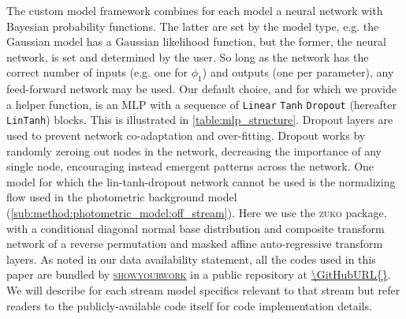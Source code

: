 \documentclass[twocolumn]{aastex631}
\newcommand{\code}[1]{\textsc{#1}}
\newcommand{\package}[1]{\code{#1}}
\begin{document}
        The custom model framework combines for each model a neural network with
        Bayesian probability functions. The latter are set by the model type,
        e.g. the Gaussian model has a Gaussian likelihood function, but the
        former, the neural network, is set and determined by the user. So long
        as the network has the correct number of inputs (e.g. one for $\phi_1$)
        and outputs (one per parameter), any feed-forward network may be used.
        Our default choice, and for which we provide a helper function, is an
        MLP with a sequence of \texttt{Linear} \!\!\textrightarrow \texttt{Tanh}
        \!\!\textrightarrow \texttt{Dropout} (hereafter \texttt{LinTanh})
        blocks. This is illustrated in \autoref{table:mlp_structure}.
        Dropout layers are used to prevent network co-adaptation and
        over-fitting. Dropout works by randomly zeroing out nodes in the
        network, decreasing the importance of any single node, encouraging
        instead emergent patterns across the network.  One model for which the
        lin-tanh-dropout network cannot be used is the normalizing flow used in
        the photometric background model
        (\autoref{sub:method:photometric_model:off_stream}). Here we use the
        \package{zuko} package, with a conditional diagonal normal base
        distribution and composite transform network of a reverse permutation
        and masked affine auto-regressive transform layers. As noted in our data
        availability statement, all the codes used in this paper are bundled by
        \href{https://github.com/showyourwork/showyourwork}{\package{showyourwork}}
        in a public repository at \url{\GitHubURL{}}. We will describe for each
        stream model specifics relevant to that stream but refer readers to the
        publicly-available code itself for code implementation details.
\end{document}
